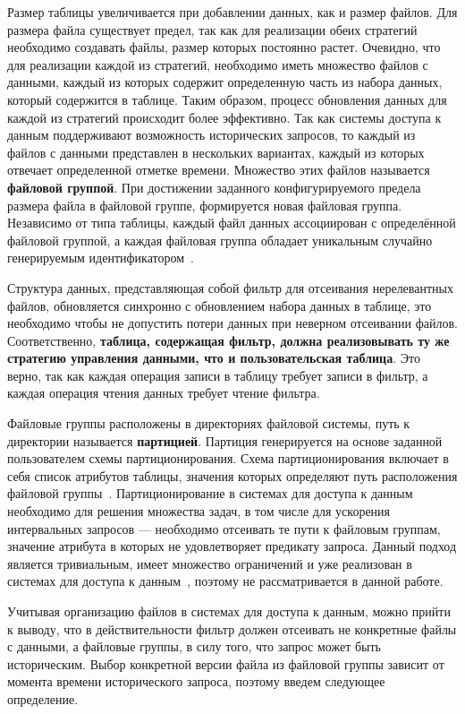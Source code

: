 Размер таблицы увеличивается при добавлении данных, как и размер файлов. Для размера файла существует предел, так как для реализации обеих стратегий необходимо создавать файлы, размер которых постоянно растет. Очевидно, что для реализации каждой из стратегий, необходимо иметь множество файлов с данными, каждый из которых содержит определенную часть из набора данных, который содержится в таблице. Таким образом, процесс обновления данных для каждой из стратегий происходит более эффективно. Так как системы доступа к данным поддерживают возможность исторических запросов, то каждый из файлов с данными представлен в нескольких вариантах, каждый из которых отвечает определенной отметке времени. Множество этих файлов называется \textbf{файловой группой}. При достижении заданного конфигурируемого предела размера файла в файловой группе, формируется новая файловая группа. Независимо от типа таблицы, каждый файл данных ассоциирован с определённой файловой группой, а каждая файловая группа обладает уникальным случайно генерируемым идентификатором~\cite{Hudi_File_layouts}.

Структура данных, представляющая собой фильтр для отсеивания нерелевантных файлов, обновляется синхронно с обновлением набора данных в таблице, это необходимо чтобы не допустить потери данных при неверном отсеивании файлов. Соответственно, \textbf{таблица, содержащая фильтр, должна реализовывать ту же стратегию управления данными, что и пользовательская таблица}. Это верно, так как каждая операция записи в таблицу требует записи в фильтр, а каждая операция чтения данных требует чтение фильтра.

Файловые группы расположены в директориях файловой системы, путь к директории называется \textbf{партицией}. Партиция генерируется на основе заданной пользователем схемы партиционирования. Схема партиционирования включает в себя список атрибутов таблицы, значения которых определяют путь расположения файловой группы~\cite{Hudi_File_layouts}. Партиционирование в системах для доступа к данным необходимо для решения множества задач, в том числе для ускорения интервальных запросов --- необходимо отсеивать те пути к файловым группам, значение атрибута в которых не удовлетворяет предикату запроса. Данный подход является тривиальным, имеет множество ограничений и уже реализован в системах для доступа к данным~\cite{Spatial_big_data_architecture}, поэтому не рассматривается в данной работе.

Учитывая организацию файлов в системах для доступа к данным, можно прийти к выводу, что в действительности фильтр должен отсеивать не конкретные файлы с данными, а файловые группы, в силу того, что запрос может быть историческим. Выбор конкретной версии файла из файловой группы зависит от момента времени исторического запроса, поэтому введем следующее определение.

